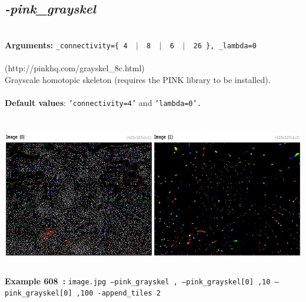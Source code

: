 \documentclass[a4paper,11pt,twoside]{book}
\begin{document}
\subsection{\emph{-pink\_grayskel} }\vspace*{-0.5em}
~\\\textbf{Arguments: } 
{\small \texttt{\_connectivity=\{ 4 ~$|$~ 8 ~$|$~ 6 ~$|$~ 26 \}, \_lambda=0}}\\~\\
(http://pinkhq.com/grayskel\_8c.html)
~\\Grayscale homotopic skeleton (requires the PINK library to be installed).
~\\~\\\textbf{Default values}: {\small \texttt{'connectivity=4'} and \texttt{'lambda=0'.}}
\begin{center}\includegraphics[keepaspectratio=true,height=7cm,width=\textwidth]{img/gmic_def608.jpg}\\
{\footnotesize \textbf{Example 608~:} \texttt{image.jpg --pink\_grayskel , --pink\_grayskel[0] ,10 --pink\_grayskel[0] ,100 -append\_tiles 2}}
\end{center}
\end{document}
